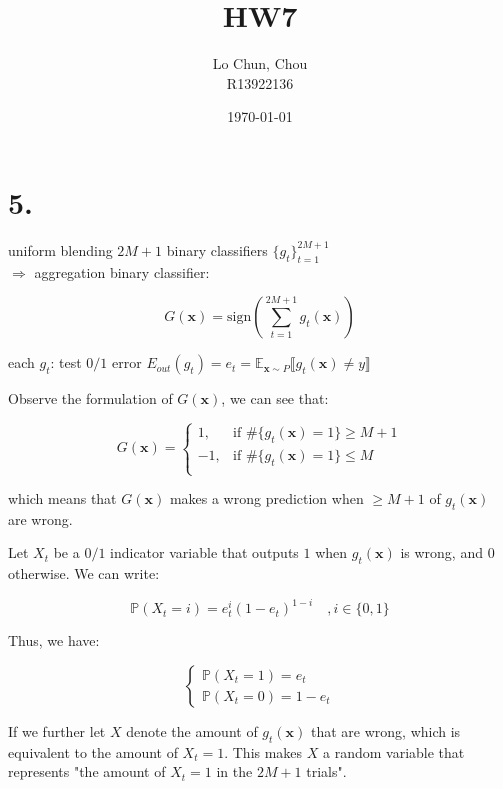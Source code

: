 \documentclass{article}
\title{HW7}
\author{Lo Chun, Chou \\ R13922136}
\date\today
\begin{document}
\setlength{\parindent}{0pt}
\maketitle 

\section*{5.}

uniform blending $2M +1$ binary classifiers $\{g_t\}_{t=1}^{2M+1}$ \\
$\Rightarrow$ aggregation binary classifier:

\begin{equation*}
    G(\mathbf{x}) = \mathrm{sign}\left(\sum_{t=1}^{2M+1} g_t(\mathbf{x})\right)
\end{equation*}

each $g_t$: test $0/1$ error $E_{out}(g_t) = e_t = \mathbb{E}_{\mathbf{x} \sim P}\llbracket g_t(\mathbf{x}) \neq y\rrbracket$
\bigskip

Observe the formulation of $ G(\mathbf{x})$, we can see that:

\begin{equation*}
    G(\mathbf{x}) = 
    \begin{cases}
        1, & \text{if } \#\{g_t(\mathbf{x}) = 1\} \ge M+1 \\
        -1, & \text{if } \#\{g_t(\mathbf{x}) = 1\} \le M \\
    \end{cases}
\end{equation*}

which means that $G(\mathbf{x})$ makes a wrong prediction when $\ge M + 1$ of $g_t(\mathbf{x})$ are wrong.
\bigskip

Let $X_t$ be a $0/1$ indicator variable that outputs $1$ when $g_t(\mathbf{x})$ is wrong, and $0$ otherwise. 
We can write:

\begin{equation*}
    \mathbb{P}(X_t = i) = e_t^i (1 - e_t)^{1-i} \quad ,i \in \{0, 1\}
\end{equation*}

Thus, we have:

$$
\begin{cases}
    \mathbb{P}(X_t = 1) = e_t \\
    \mathbb{P}(X_t = 0) = 1 - e_t
\end{cases}    
$$

If we further let $X$ denote the amount of $g_t(\mathbf{x})$ that are wrong, 
which is equivalent to the amount of $X_t = 1$. 
This makes $X$ a random variable that represents "the amount of $X_t = 1$ in the $2M + 1$ trials".
\bigskip
\end{document}
